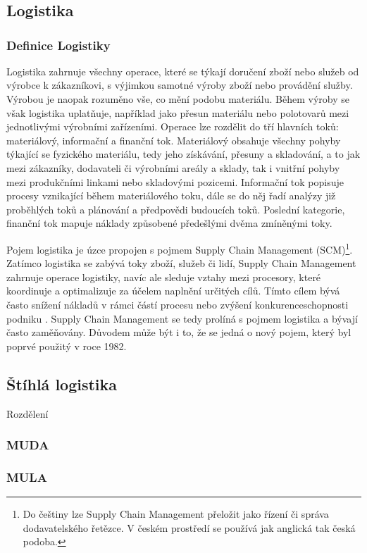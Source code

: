 \chapter{}

\cite{bib:Jones}

\section{Logistika}

\subsection*{Definice Logistiky}

Logistika zahrnuje všechny operace, které se týkají doručení zboží nebo služeb od výrobce k zákazníkovi, s výjimkou samotné výroby zboží nebo provádění služby. Výrobou je naopak rozuměno vše, co mění podobu materiálu.
Během výroby se však logistika uplatňuje, například jako přesun materiálu nebo polotovarů mezi jednotlivými výrobními zařízeními. 
Operace lze rozdělit do tří hlavních toků: materiálový, informační a finanční tok. Materiálový obsahuje všechny pohyby týkající se fyzického materiálu, tedy jeho získávání, přesuny a skladování, a to jak mezi zákazníky, dodavateli či výrobními areály a sklady, tak i vnitřní pohyby mezi produkčními linkami nebo skladovými pozicemi. Informační tok popisuje procesy vznikající během materiálového toku, dále se do něj řadí analýzy již proběhlých toků a plánování a předpovědi budoucích toků. Poslední kategorie, finanční tok mapuje náklady způsobené předešlými dvěma zmíněnými toky.\cite{bib:Baudin}

Pojem logistika je úzce propojen s pojmem Supply Chain Management (SCM)\footnote{Do češtiny lze Supply Chain Management přeložit jako řízení či správa dodavatelského řetězce. V českém prostředí se používá jak anglická tak česká podoba.}. Zatímco logistika se zabývá toky zboží, služeb či lidí, Supply Chain Management zahrnuje operace logistiky, navíc ale sleduje vztahy mezi procesory, které koordinuje a optimalizuje za účelem naplnění určitých cílů. Tímto cílem bývá často snížení nákladů v rámci částí procesu nebo zvýšení konkurenceschopnosti podniku \cite{bib:IIMudaipur}. Supply Chain Management se tedy prolíná s pojmem logistika a bývají často zaměňovány. Důvodem může být i to, že se jedná o nový pojem, který byl poprvé použitý v roce 1982.\cite{bib:Christopher} 

\section{Štíhlá logistika}

Rozdělení 

\subsection*{MUDA}
\subsection*{MULA}